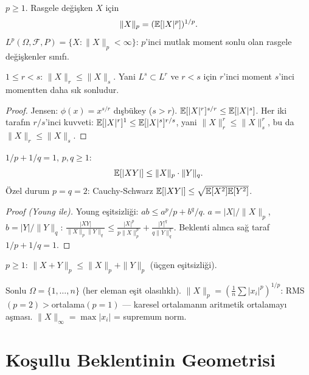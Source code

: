 \begin{tanim}[$L^p$ normu]\label{def:lp_norm}
$p\geq1$. Rasgele değişken $X$ için
\[
  \|X\|_p = (\mathbb{E}[|X|^p])^{1/p}.
\]
$L^p(\Omega,\mathcal{F},P)=\{X:\|X\|_p<\infty\}$: $p$'inci mutlak moment sonlu olan rasgele değişkenler sınıfı.
\end{tanim}

\begin{teorem}\label{thm:lyapunov_esit}
$1\leq r<s$: $\|X\|_r\leq\|X\|_s$.
Yani $L^s\subset L^r$ ve $r < s$ için $r$'inci moment $s$'inci momentten daha sık sonludur.
\end{teorem}

\begin{proof}
Jensen: $\phi(x)=x^{s/r}$ dışbükey ($s>r$). $\mathbb{E}[|X|^r]^{s/r}\leq\mathbb{E}[|X|^s]$. Her iki tarafın $r/s$'inci kuvveti: $\mathbb{E}[|X|^r]^{1}\leq\mathbb{E}[|X|^s]^{r/s}$, yani $\|X\|_r^r\leq\|X\|_s^r$, bu da $\|X\|_r\leq\|X\|_s$.
\end{proof}

\begin{teorem}\label{thm:holder}
$1/p+1/q=1$, $p,q\geq1$:
\[
  \mathbb{E}[|XY|] \leq \|X\|_p\cdot\|Y\|_q.
\]
Özel durum $p=q=2$: Cauchy-Schwarz $\mathbb{E}[|XY|]\leq\sqrt{\mathbb{E}[X^2]\mathbb{E}[Y^2]}$.
\end{teorem}

\begin{proof}[Proof (Young ile)]
Young eşitsizliği: $ab\leq a^p/p+b^q/q$. $a=|X|/\|X\|_p$, $b=|Y|/\|Y\|_q$: $\frac{|XY|}{\|X\|_p\|Y\|_q}\leq\frac{|X|^p}{p\|X\|_p^p}+\frac{|Y|^q}{q\|Y\|_q^q}$. Beklenti alınca sağ taraf $1/p+1/q=1$.
\end{proof}

\begin{teorem}\label{thm:minkowski}
$p\geq1$: $\|X+Y\|_p\leq\|X\|_p+\|Y\|_p$ (üçgen eşitsizliği).
\end{teorem}

\begin{ornek}\label{ex:lp_dahil}
Sonlu $\Omega=\{1,\ldots,n\}$ (her eleman eşit olasılıklı). $\|X\|_p=(\frac1n\sum|x_i|^p)^{1/p}$: RMS$(p=2)>$ortalama$(p=1)$ --- karesel ortalamanın aritmetik ortalamayı aşması. $\|X\|_\infty=\max|x_i|$ = supremum norm.
\end{ornek}

\section{Koşullu Beklentinin Geometrisi}
\label{sec:kb_geometri}

